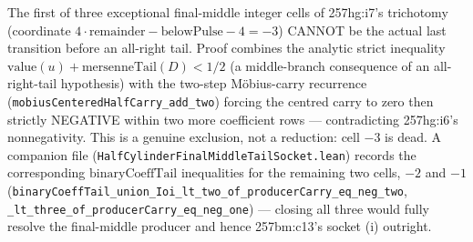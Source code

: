 \begin{thm}
The first of three exceptional final-middle integer cells of 257hg:i7's trichotomy (coordinate
$4\cdot\mathrm{remainder}-\mathrm{belowPulse}-4=-3$) CANNOT be the actual last transition before
an all-right tail. Proof combines the analytic strict inequality
$\mathrm{value}(u)+\mathrm{mersenneTail}(D) < 1/2$ (a middle-branch consequence of an
all-right-tail hypothesis) with the two-step M\"obius-carry recurrence
(\texttt{mobiusCenteredHalfCarry\_add\_two}) forcing the centred carry to zero then strictly
NEGATIVE within two more coefficient rows — contradicting 257hg:i6's nonnegativity. This is a
genuine exclusion, not a reduction: cell $-3$ is dead. A companion file
(\texttt{HalfCylinderFinalMiddleTailSocket.lean}) records the corresponding
$\mathrm{binaryCoeffTail}$ inequalities for the remaining two cells, $-2$ and $-1$
(\texttt{binaryCoeffTail\_union\_Ioi\_lt\_two\_of\_producerCarry\_eq\_neg\_two},
\texttt{\_lt\_three\_of\_producerCarry\_eq\_neg\_one}) — closing all three would fully resolve the
final-middle producer and hence 257bm:c13's socket (i) outright.
\par\noindent{}     
\end{thm}

